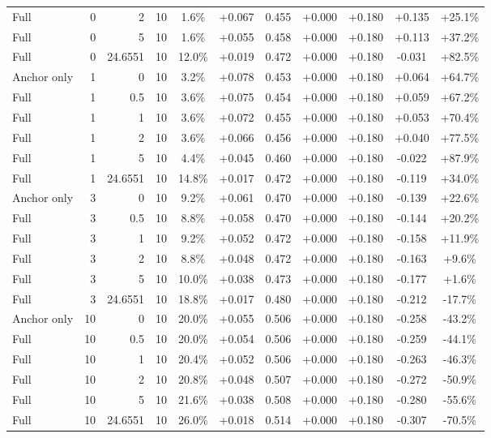 \begin{table}[htbp]
\begin{tabular}{lrrrccccccc}
Full & 0 & 2 & 10 & 1.6\% & +0.067 & 0.455 & +0.000 & +0.180 & +0.135 & +25.1\% \\
Full & 0 & 5 & 10 & 1.6\% & +0.055 & 0.458 & +0.000 & +0.180 & +0.113 & +37.2\% \\
Full & 0 & 24.6551 & 10 & 12.0\% & +0.019 & 0.472 & +0.000 & +0.180 & -0.031 & +82.5\% \\
Anchor only & 1 & 0 & 10 & 3.2\% & +0.078 & 0.453 & +0.000 & +0.180 & +0.064 & +64.7\% \\
Full & 1 & 0.5 & 10 & 3.6\% & +0.075 & 0.454 & +0.000 & +0.180 & +0.059 & +67.2\% \\
Full & 1 & 1 & 10 & 3.6\% & +0.072 & 0.455 & +0.000 & +0.180 & +0.053 & +70.4\% \\
Full & 1 & 2 & 10 & 3.6\% & +0.066 & 0.456 & +0.000 & +0.180 & +0.040 & +77.5\% \\
Full & 1 & 5 & 10 & 4.4\% & +0.045 & 0.460 & +0.000 & +0.180 & -0.022 & +87.9\% \\
Full & 1 & 24.6551 & 10 & 14.8\% & +0.017 & 0.472 & +0.000 & +0.180 & -0.119 & +34.0\% \\
Anchor only & 3 & 0 & 10 & 9.2\% & +0.061 & 0.470 & +0.000 & +0.180 & -0.139 & +22.6\% \\
Full & 3 & 0.5 & 10 & 8.8\% & +0.058 & 0.470 & +0.000 & +0.180 & -0.144 & +20.2\% \\
Full & 3 & 1 & 10 & 9.2\% & +0.052 & 0.472 & +0.000 & +0.180 & -0.158 & +11.9\% \\
Full & 3 & 2 & 10 & 8.8\% & +0.048 & 0.472 & +0.000 & +0.180 & -0.163 & +9.6\% \\
Full & 3 & 5 & 10 & 10.0\% & +0.038 & 0.473 & +0.000 & +0.180 & -0.177 & +1.6\% \\
Full & 3 & 24.6551 & 10 & 18.8\% & +0.017 & 0.480 & +0.000 & +0.180 & -0.212 & -17.7\% \\
Anchor only & 10 & 0 & 10 & 20.0\% & +0.055 & 0.506 & +0.000 & +0.180 & -0.258 & -43.2\% \\
Full & 10 & 0.5 & 10 & 20.0\% & +0.054 & 0.506 & +0.000 & +0.180 & -0.259 & -44.1\% \\
Full & 10 & 1 & 10 & 20.4\% & +0.052 & 0.506 & +0.000 & +0.180 & -0.263 & -46.3\% \\
Full & 10 & 2 & 10 & 20.8\% & +0.048 & 0.507 & +0.000 & +0.180 & -0.272 & -50.9\% \\
Full & 10 & 5 & 10 & 21.6\% & +0.038 & 0.508 & +0.000 & +0.180 & -0.280 & -55.6\% \\
Full & 10 & 24.6551 & 10 & 26.0\% & +0.018 & 0.514 & +0.000 & +0.180 & -0.307 & -70.5\% \\

\end{tabular}
\end{table}
